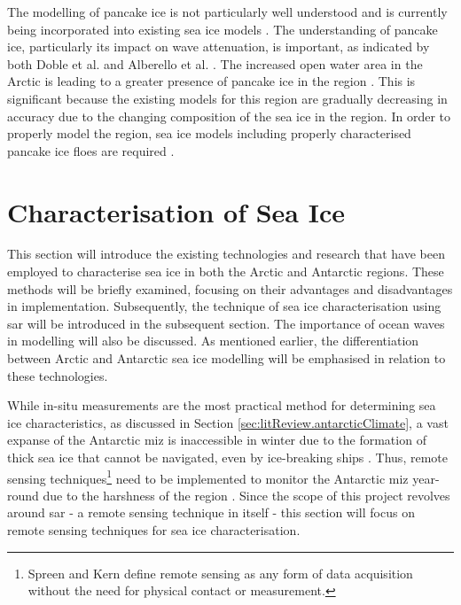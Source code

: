 The modelling of pancake ice is not particularly well understood and is currently being incorporated into existing sea ice models \cite{Alberello2019}. The understanding of pancake ice, particularly its impact on wave attenuation, is important, as indicated by both Doble et al. \cite{Doble2015} and Alberello et al. \cite{Alberello2019}. The increased open water area in the Arctic is leading to a greater presence of pancake ice in the region \cite{Alberello2019,Doble2015}. This is significant because the existing models for this region are gradually decreasing in accuracy due to the changing composition of the sea ice in the region. In order to properly model the region, sea ice models including properly characterised pancake ice floes are required \cite{Doble2015}.


\section{Characterisation of Sea Ice}
\label{sec:litReview.seaIceCharac}

This section will introduce the existing technologies and research that have been employed to characterise sea ice in both the Arctic and Antarctic regions. These methods will be briefly examined, focusing on their advantages and disadvantages in implementation. Subsequently, the technique of sea ice characterisation using \acs{sar} will be introduced in the subsequent section. The importance of ocean waves in modelling will also be discussed. As mentioned earlier, the differentiation between Arctic and Antarctic sea ice modelling will be emphasised in relation to these technologies.

While in-situ measurements are the most practical method for determining sea ice characteristics, as discussed in Section \ref{sec:litReview.antarcticClimate}, a vast expanse of the Antarctic \acs{miz} is inaccessible in winter due to the formation of thick sea ice that cannot be navigated, even by ice-breaking ships \cite{Maksym2012}. Thus, remote sensing techniques\footnote{Spreen and Kern \cite{Thomas2017Chap9} define remote sensing as any form of data acquisition without the need for physical contact or measurement.} need to be implemented to monitor the Antarctic \acs{miz} year-round due to the harshness of the region \cite{Kennicut2019, Maksym2012}. Since the scope of this project revolves around \acs{sar} - a remote sensing technique in itself - this section will focus on remote sensing techniques for sea ice characterisation.

